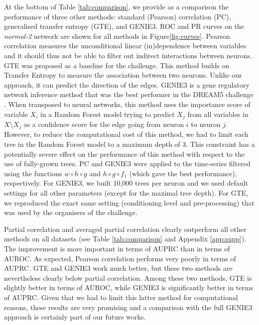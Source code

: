 \documentclass[wcp]{jmlr}
\begin{document}
At the bottom of Table \ref{tab:comparison}, we provide as a comparison the
performance of three other methods: standard (Pearson) correlation (PC),
generalised transfer entropy (GTE), and GENIE3. ROC and PR curves on the
\textit{normal-2} network are shown for all methods in Figure\ref{fig:curves}. Pearson correlation measures the unconditional linear
(in)dependence between variables and it should thus not be able to filter out
indirect interactions between neurons. GTE \citep{stetter2012model} was
proposed as a baseline for the challenge. This method builds on Transfer
Entropy to measure the association between two neurons. Unlike our approach, it
can predict the direction of the edges. GENIE3 \citep{huynhthu2010inferring} is
a gene regulatory network inference method that was the best performer in the
DREAM5 challenge \citep{marbach2012}. When transposed to neural networks, this
method uses the importance score of variable $X_i$ in a Random Forest model trying to
predict $X_j$ from all variables in $X\setminus X_j$ as a confidence score for the edge going from neuron $i$ to neuron
$j$. However, to reduce the
computational cost of this method, we had to limit each tree in the
Random Forest model to a maximum depth of 3. This constraint has a potentially
severe effect on the performance of this method with respect to the use of
fully-grown trees. PC and GENIE3 were applied to the time-series filtered using the functions $w\circ h\circ g$ and $h\circ g\circ f_1$ (which
gave the best performance), respectively. For GENIE3, we built 10,000 trees per neuron and we
used default settings for all other parameters (except for the maximal tree
depth). For GTE, we reproduced the exact same setting (conditioning level and
pre-processing) that was used by the organisers of the challenge.

Partial correlation and averaged partial correlation clearly outperform all
other methods on all datasets (see Table \ref{tab:comparison} and Appendix \ref{app:supp}). The
improvement is more important in terms of AUPRC than in terms of AUROC. As
expected, Pearson correlation performs very poorly in terms of AUPRC. GTE and
GENIE3 work much better, but these two methods are nevertheless clearly below
partial correlation. Among these two methods, GTE is slightly better in terms
of AUROC, while GENIE3 is significantly better in terms of AUPRC. Given that we
had to limit this latter method for computational reasons, these results are
very promising and a comparison with the full GENIE3 approach is certainly part
of our future works.
\end{document}
